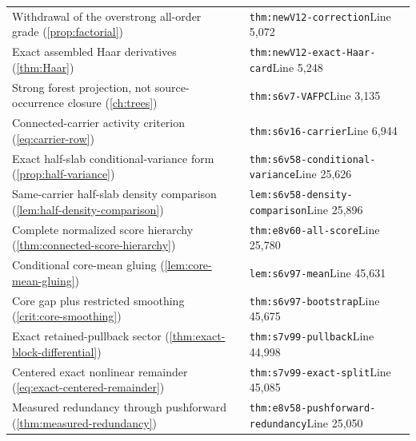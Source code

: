 \documentclass[11pt,oneside,openany]{book}
\theoremstyle{definition}
\theoremstyle{remark}
\begin{document}
\begin{longtable}{L{0.32\textwidth}L{0.12\textwidth}L{0.477\textwidth}}
Withdrawal of the overstrong all-order grade (\cref{prop:factorial}) & \cite{F5} & \nolinkurl{thm:newV12-correction}\newline Line 5,072 \\
Exact assembled Haar derivatives (\cref{thm:Haar}) & \cite{F5} & \nolinkurl{thm:newV12-exact-Haar-card}\newline Line 5,248 \\
Strong forest projection, not source-occurrence closure (\cref{ch:trees}) & \cite{F6} & \nolinkurl{thm:s6v7-VAFPC}\newline Line 3,135 \\
Connected-carrier activity criterion (\cref{eq:carrier-row}) & \cite{F6} & \nolinkurl{thm:s6v16-carrier}\newline Line 6,944 \\
Exact half-slab conditional-variance form (\cref{prop:half-variance}) & \cite{F6} & \nolinkurl{thm:s6v58-conditional-variance}\newline Line 25,626 \\
Same-carrier half-slab density comparison (\cref{lem:half-density-comparison}) & \cite{F6} & \nolinkurl{lem:s6v58-density-comparison}\newline Line 25,896 \\
Complete normalized score hierarchy (\cref{thm:connected-score-hierarchy}) & \cite{F8} & \nolinkurl{thm:e8v60-all-score}\newline Line 25,780 \\
Conditional core-mean gluing (\cref{lem:core-mean-gluing}) & \cite{F6} & \nolinkurl{lem:s6v97-mean}\newline Line 45,631 \\
Core gap plus restricted smoothing (\cref{crit:core-smoothing}) & \cite{F6} & \nolinkurl{thm:s6v97-bootstrap}\newline Line 45,675 \\
Exact retained-pullback sector (\cref{thm:exact-block-differential}) & \cite{F7} & \nolinkurl{thm:s7v99-pullback}\newline Line 44,998 \\
Centered exact nonlinear remainder (\cref{eq:exact-centered-remainder}) & \cite{F7} & \nolinkurl{thm:s7v99-exact-split}\newline Line 45,085 \\
Measured redundancy through pushforward (\cref{thm:measured-redundancy}) & \cite{F8} & \nolinkurl{thm:e8v58-pushforward-redundancy}\newline Line 25,050 \\

\end{longtable}
\end{document}
